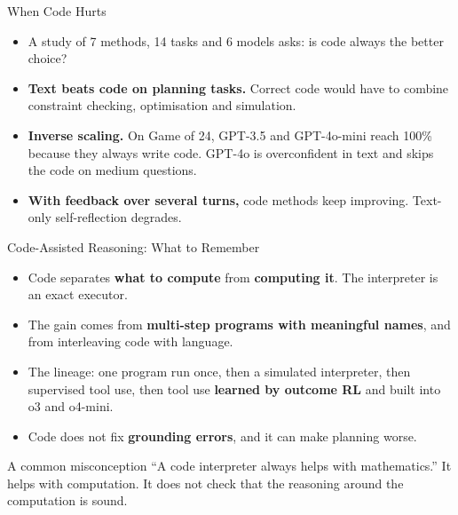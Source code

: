\begin{frame}{When Code Hurts}
    \begin{itemize}\itemsep0.5em
        \item A study of 7 methods, 14 tasks and 6 models asks: is code always the better choice?
        \item \textbf{Text beats code on planning tasks.} Correct code would have to combine constraint checking, optimisation and simulation.
        \item \textbf{Inverse scaling.} On Game of 24, GPT-3.5 and GPT-4o-mini reach 100\% because they always write code. \alert{GPT-4o is overconfident in text and skips the code} on medium questions.
        \item \textbf{With feedback over several turns,} code methods keep improving. Text-only self-reflection degrades.
    \end{itemize}
    \vspace{0.2em}
\end{frame}

\begin{frame}{Code-Assisted Reasoning: What to Remember}
    \begin{itemize}\itemsep0.6em
        \item Code separates \textbf{what to compute} from \textbf{computing it}. The interpreter is an exact executor.
        \item The gain comes from \textbf{multi-step programs with meaningful names}, and from interleaving code with language.
        \item The lineage: one program run once, then a simulated interpreter, then supervised tool use, then tool use \textbf{learned by outcome RL} and built into o3 and o4-mini.
        \item Code does not fix \textbf{grounding errors}, and it can make planning worse.
    \end{itemize}
    \vspace{0.3em}
    \begin{block}{A common misconception}
        ``A code interpreter always helps with mathematics.'' It helps with computation. It does not check that the reasoning around the computation is sound.
    \end{block}
    \vspace{0.3em}
\end{frame}
